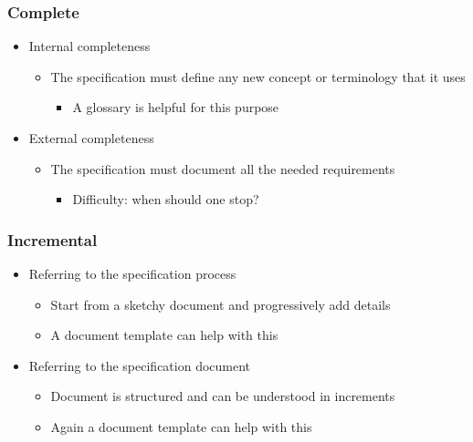 \documentclass[t,12pt,numbers,fleqn]{beamer}
\newcounter{temp}
\begin{document}
\begin{frame}
\frametitle{Complete}

\begin{itemize}

\item Internal completeness
\begin{itemize}
\item The specification must define any new concept or terminology that it uses
\begin{itemize}
\item A glossary is helpful for this purpose
\end{itemize}
\end{itemize}
\item External completeness
\begin{itemize}
\item The specification must document all the needed requirements
\begin{itemize}
\item Difficulty: when should one stop?
\end{itemize}
\end{itemize}

\end{itemize}

\end{frame}


\begin{frame}
\frametitle{Incremental}

\begin{itemize}

\item Referring to the specification process
\begin{itemize}
\item Start from a sketchy document and progressively add details
\item A document template can help with this
\end{itemize}
\item Referring to the specification document
\begin{itemize}
\item Document is structured and can be understood in increments
\item Again a document template can help with this
\end{itemize}

\end{itemize}

\end{frame}
\end{document}
